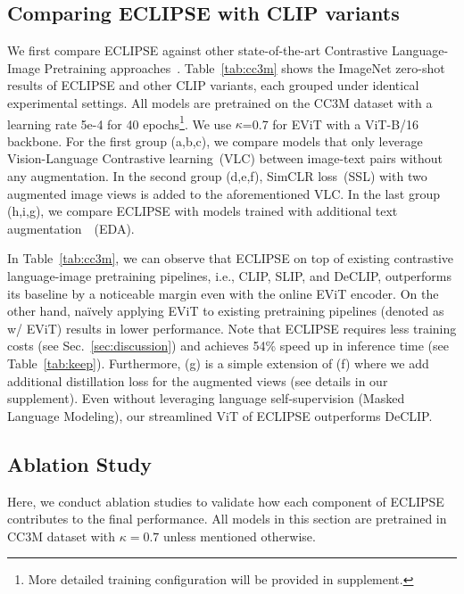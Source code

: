 \subsection{Comparing ECLIPSE with CLIP variants}
\label{sec:cc3m_comparison}


We first compare ECLIPSE against other state-of-the-art Contrastive Language-Image Pretraining approaches~\cite{radford2021learning,mu2021slip,li2022supervision}.
Table~\ref{tab:cc3m} shows the ImageNet zero-shot results of ECLIPSE and other CLIP variants, each grouped under identical experimental settings.
All models are pretrained on the CC3M dataset with a learning rate 5e-4 for 40 epochs\footnote{More detailed training configuration will be provided in supplement.}.
We use $\kappa$=0.7 for EViT with a ViT-B/16 backbone.
For the first group (a,b,c), we compare models that only leverage Vision-Language Contrastive learning~(VLC) between image-text pairs without any augmentation.
In the second group (d,e,f), SimCLR loss~(SSL) with two augmented image views is added to the aforementioned VLC.
In the last group (h,i,g), we compare ECLIPSE with models trained with additional text augmentation~\cite{wei2019eda}~(EDA).

In Table~\ref{tab:cc3m}, we can observe that ECLIPSE on top of existing contrastive language-image pretraining pipelines, i.e., CLIP, SLIP, and DeCLIP, outperforms its baseline by a noticeable margin even with the online EViT encoder.
On the other hand, na\"ively applying EViT to existing pretraining pipelines (denoted as w/ EViT) results in lower performance.
Note that ECLIPSE requires less training costs (see Sec.~\ref{sec:discussion}) and achieves 54\% speed up in inference time (see Table~\ref{tab:keep}).
Furthermore, (g) is a simple extension of (f) where we add additional distillation loss for the augmented views (see details in our supplement).
Even without leveraging language self-supervision (Masked Language Modeling), our streamlined ViT of ECLIPSE outperforms DeCLIP.



\subsection{Ablation Study}
\label{subsec:ablation}
Here, we conduct ablation studies to validate how each component of ECLIPSE contributes to the final performance.
All models in this section are pretrained in CC3M dataset with $\kappa=0.7$ unless mentioned otherwise.

